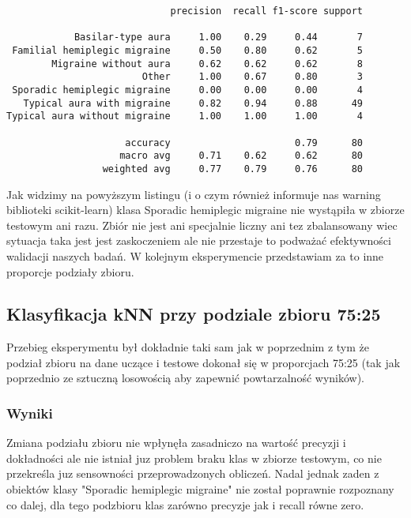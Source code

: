 \begin{verbatim}
                             precision  recall f1-score support

            Basilar-type aura     1.00    0.29     0.44       7
 Familial hemiplegic migraine     0.50    0.80     0.62       5
        Migraine without aura     0.62    0.62     0.62       8
                        Other     1.00    0.67     0.80       3
 Sporadic hemiplegic migraine     0.00    0.00     0.00       4
   Typical aura with migraine     0.82    0.94     0.88      49
Typical aura without migraine     1.00    1.00     1.00       4

                     accuracy                      0.79      80
                    macro avg     0.71    0.62     0.62      80
                 weighted avg     0.77    0.79     0.76      80
\end{verbatim}

Jak widzimy na powyższym listingu (i o czym również informuje nas warning biblioteki scikit-learn) klasa Sporadic hemiplegic migraine nie wystąpiła w zbiorze testowym ani razu. Zbiór nie jest ani specjalnie liczny ani tez zbalansowany wiec sytuacja taka jest jest zaskoczeniem ale nie przestaje to podważać efektywności walidacji naszych badań. W kolejnym eksperymencie przedstawiam za to inne proporcje podziały zbioru.

\subsection{Klasyfikacja kNN przy podziale zbioru 75:25}
Przebieg eksperymentu był dokładnie taki sam jak w poprzednim z tym że podział zbioru na dane uczące i testowe dokonał się w proporcjach 75:25 (tak jak poprzednio ze sztuczną losowością aby zapewnić powtarzalność wyników).\\

\subsubsection{Wyniki}
Zmiana podziału zbioru nie wpłynęła zasadniczo na wartość precyzji i dokładności ale nie istniał juz problem braku klas w zbiorze testowym, co nie przekreśla juz sensowności przeprowadzonych obliczeń. Nadal jednak zaden z obiektów klasy "Sporadic hemiplegic migraine" nie został poprawnie rozpoznany co dalej, dla tego podzbioru klas zarówno precyzje jak i recall równe zero.\\

